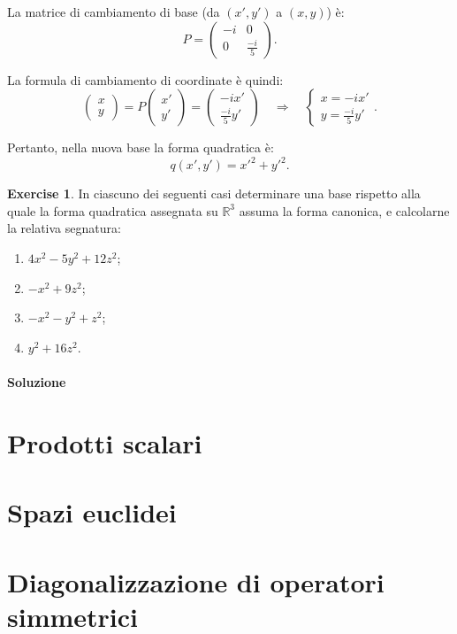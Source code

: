 \documentclass{article}
\theoremstyle{plain}
\theoremstyle{definition}
\newtheorem{xca}[exmp]{Exercise}
\theoremstyle{remark}
\begin{document}
\begin{enumerate}
La matrice di cambiamento di base (da \((x', y')\) a \((x, y)\)) è:
\[
P = \begin{pmatrix}
-i & 0 \\
0 & \frac{-i}{5}
\end{pmatrix}.
\]

La formula di cambiamento di coordinate è quindi:
\[
\begin{pmatrix}
x \\
y
\end{pmatrix}
=
P \begin{pmatrix}
x' \\
y'
\end{pmatrix}
=
\begin{pmatrix}
-i x' \\
\frac{-i}{5} y'
\end{pmatrix}
\quad \Rightarrow \quad
\begin{cases}
x = -i x' \\
y = \frac{-i}{5} y'
\end{cases}.
\]

Pertanto, nella nuova base la forma quadratica è:
\[
q(x', y') = x'^2 + y'^2.
\]
\end{enumerate}

\vspace{10pt}

\begin{bxthm}
\begin{xca}
    In ciascuno dei seguenti casi determinare una base rispetto alla quale la forma quadratica assegnata su $\mathbb{R}^3$ 
    assuma la forma canonica, e calcolarne la relativa segnatura:
    \begin{enumerate}
        \item $4x^2-5y^2+12z^2$;
        \item $-x^2+9z^2$;
        \item $-x^2-y^2+z^2$;
        \item $y^2+16z^2$.
    \end{enumerate}
\end{xca}
\end{bxthm}
\paragraph{Soluzione}


\newpage
\section{Prodotti scalari}
\vspace{20pt}

\newpage
\section{Spazi euclidei}
\vspace{20pt}

\newpage
\section{Diagonalizzazione di operatori simmetrici}
\vspace{20pt}
\end{document}

